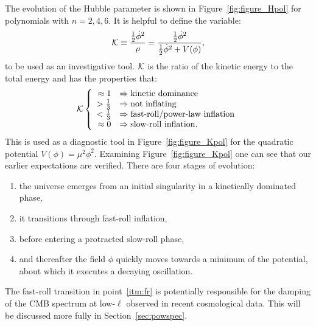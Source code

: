 The evolution of the Hubble parameter is shown in Figure~\ref{fig:figure_Hpol} for polynomials with \(n=2,4,6\). It is helpful to define the variable:
%
\begin{equation}
  \mathcal{K} 
  \equiv  
  \frac{\frac{1}{2}\dot{\phi}^2  }{\rho}  
  =  
  \frac{\frac{1}{2}\dot{\phi}^2  }
  {\frac{1}{2}\dot{\phi}^2 + V(\phi)},
\end{equation}
%
to be used as an investigative tool. \(\mathcal{K}\) is the ratio of the kinetic energy to the total energy and has the properties that:
%
\begin{equation}
  \Kfrac 
    \left\{
    \begin{array}{rl}
      \approx 1 &\Rightarrow \hbox{kinetic dominance} 
      \\
      >\frac{1}{3} &\Rightarrow \hbox{not inflating}
      \\
      <\frac{1}{3} &\Rightarrow \hbox{fast-roll/power-law inflation}
      \\
      \approx 0 &\Rightarrow \hbox{slow-roll inflation.}
    \end{array}
%
    \right.
\end{equation}
%
This is used as a diagnostic tool in Figure~\ref{fig:figure_Kpol} for the quadratic potential \(V(\phi) = \mu^2\phi^2\). Examining Figure~\ref{fig:figure_Kpol} one can see that our earlier expectations are verified. There are four stages of evolution:
%
\begin{enumerate}
  \item the universe emerges from an initial singularity in a
    kinetically dominated phase,
  \item it transitions through fast-roll inflation,\label{itm:fr}
  \item before entering a protracted slow-roll phase, 
  \item and thereafter the field \(\phi\) quickly moves towards a minimum of the potential, about which it executes a decaying oscillation.
\end{enumerate}
%
The fast-roll transition in point~\eqref{itm:fr} is potentially responsible for the damping of the CMB spectrum at low-\(\ell\) observed in recent cosmological data. This will be discussed more fully in Section~\ref{sec:powspec}.



